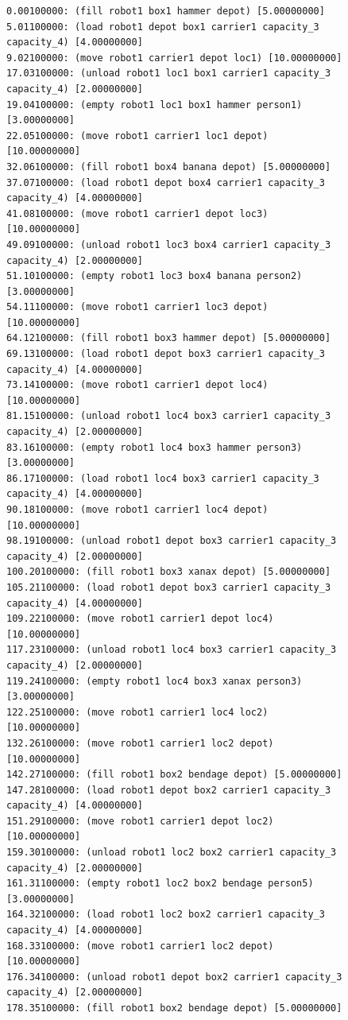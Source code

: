 \begin{figure}[h!]
    \begin{verbatim}
0.00100000: (fill robot1 box1 hammer depot) [5.00000000]
5.01100000: (load robot1 depot box1 carrier1 capacity_3 capacity_4) [4.00000000]
9.02100000: (move robot1 carrier1 depot loc1) [10.00000000]
17.03100000: (unload robot1 loc1 box1 carrier1 capacity_3 capacity_4) [2.00000000]
19.04100000: (empty robot1 loc1 box1 hammer person1) [3.00000000]
22.05100000: (move robot1 carrier1 loc1 depot) [10.00000000]
32.06100000: (fill robot1 box4 banana depot) [5.00000000]
37.07100000: (load robot1 depot box4 carrier1 capacity_3 capacity_4) [4.00000000]
41.08100000: (move robot1 carrier1 depot loc3) [10.00000000]
49.09100000: (unload robot1 loc3 box4 carrier1 capacity_3 capacity_4) [2.00000000]
51.10100000: (empty robot1 loc3 box4 banana person2) [3.00000000]
54.11100000: (move robot1 carrier1 loc3 depot) [10.00000000]
64.12100000: (fill robot1 box3 hammer depot) [5.00000000]
69.13100000: (load robot1 depot box3 carrier1 capacity_3 capacity_4) [4.00000000]
73.14100000: (move robot1 carrier1 depot loc4) [10.00000000]
81.15100000: (unload robot1 loc4 box3 carrier1 capacity_3 capacity_4) [2.00000000]
83.16100000: (empty robot1 loc4 box3 hammer person3) [3.00000000]
86.17100000: (load robot1 loc4 box3 carrier1 capacity_3 capacity_4) [4.00000000]
90.18100000: (move robot1 carrier1 loc4 depot) [10.00000000]
98.19100000: (unload robot1 depot box3 carrier1 capacity_3 capacity_4) [2.00000000]
100.20100000: (fill robot1 box3 xanax depot) [5.00000000]
105.21100000: (load robot1 depot box3 carrier1 capacity_3 capacity_4) [4.00000000]
109.22100000: (move robot1 carrier1 depot loc4) [10.00000000]
117.23100000: (unload robot1 loc4 box3 carrier1 capacity_3 capacity_4) [2.00000000]
119.24100000: (empty robot1 loc4 box3 xanax person3) [3.00000000]
122.25100000: (move robot1 carrier1 loc4 loc2) [10.00000000]
132.26100000: (move robot1 carrier1 loc2 depot) [10.00000000]
142.27100000: (fill robot1 box2 bendage depot) [5.00000000]
147.28100000: (load robot1 depot box2 carrier1 capacity_3 capacity_4) [4.00000000]
151.29100000: (move robot1 carrier1 depot loc2) [10.00000000]
159.30100000: (unload robot1 loc2 box2 carrier1 capacity_3 capacity_4) [2.00000000]
161.31100000: (empty robot1 loc2 box2 bendage person5) [3.00000000]
164.32100000: (load robot1 loc2 box2 carrier1 capacity_3 capacity_4) [4.00000000]
168.33100000: (move robot1 carrier1 loc2 depot) [10.00000000]
176.34100000: (unload robot1 depot box2 carrier1 capacity_3 capacity_4) [2.00000000]
178.35100000: (fill robot1 box2 bendage depot) [5.00000000]

\end{verbatim}
\end{figure}
